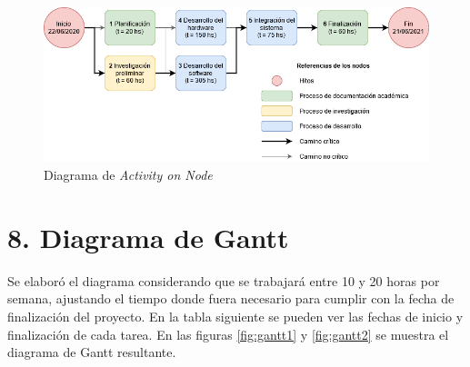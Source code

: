\documentclass[11pt]{charter}
\begin{document}
\begin{figure}[htpb]
\centering 
\includegraphics[width=1\textwidth]{./Figuras/activity_on_node.png}
\caption{Diagrama de \textit{Activity on Node}}
\label{fig:AoN}
\end{figure}

\newpage

\section{8. Diagrama de Gantt}
\label{sec:gantt}

Se elaboró el diagrama considerando que se trabajará entre 10 y 20 horas por semana, ajustando el tiempo
donde fuera necesario para cumplir con la fecha de finalización del proyecto. En la tabla siguiente se pueden ver las fechas de
inicio y finalización de cada tarea. En las figuras \ref{fig:gantt1} y \ref{fig:gantt2} se muestra el diagrama de Gantt resultante.
\end{document}
